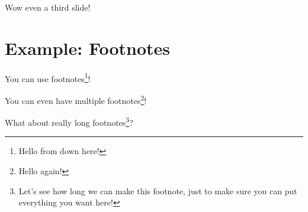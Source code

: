 \documentclass[aspectratio=169,17pt,institute=none]{tuhh_presentation}
\begin{document}
\begin{frame}{Wow even a third slide!}
    \section{Example: Footnotes}

    You can use footnotes\footnote{Hello from down here!}!

    You can even have multiple footnotes\footnote{Hello again!}!

    What about really long footnotes\footnote{Let's see how long we can make this footnote, just to make sure you can put everything you want here!}?

\end{frame}

\finalpage
\end{document}
